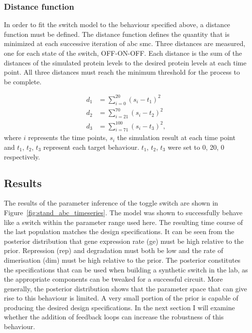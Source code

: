 \subsubsection{Distance function}
In order to fit the switch model to the behaviour specified above, a distance function must be defined. The distance function defines the quantity that is minimized at each successive iteration of \acrshort{abc} \acrshort{smc}. Three distances are measured, one for each state of the switch, OFF-ON-OFF. Each distance is the sum of the distances of the simulated protein levels to the desired protein levels at each time point. All three distances must reach the minimum threshold for the process to be complete. 

\begin{align}\label{eq:dist}
	d_1 &= \sum_{i=0}^{20} (s_i-t_1)^2 \\
	d_2 &= \sum_{i=21}^{70} (s_i-t_2)^2 \\
	d_3 &=  \sum_{i=71}^{100} (s_i-t_3)^2,
\end{align}
where $i$ represents the time points, $s_i$ the simulation result at  each time point and $t_1$, $t_2$, $t_3$ represent each target behaviour. $t_1$, $t_2$, $t_3$ were set to 0, 20, 0 respectively. 



\subsection{Results}

The results of the parameter inference of the toggle switch are shown in Figure~\ref{fig:stand_abc_timeseries}. The model was shown to successfully behave like a switch within the parameter range used here. The resulting time course of the last population matches the design specifications. It can be seen from the posterior distribution that gene expression rate (ge) must be high relative to the prior. Repression (rep) and degradation must both be low and the rate of dimerisation (dim) must be high relative to the prior. The posterior constitutes the specifications that can be used when building a synthetic switch in the lab, as the appropriate components can be tweaked for a successful circuit. More generally, the posterior distribution shows that the parameter space that can give rise to this behaviour is limited. A very small portion of the prior is capable of producing the desired design specifications. In the next section I will examine whether the addition of feedback loops can increase the robustness of this behaviour.


